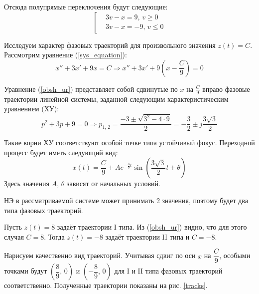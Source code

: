 	Отсюда полупрямые переключения будут следующие:
	\begin{equation}
		\left[\begin{aligned}
			&3v-x = 9,\,v\geq 0 \\
			&3v-x = -9,\,v\leq 0 
		\end{aligned}\right.
		\label{perekl}
	\end{equation}
	
	Исследуем характер фазовых траекторий для произвольного значения $z(t) = C$. Рассмотрим уравнение (\ref{sys_equation}):
	\begin{equation}
		x''+3x'+9x = C \Rightarrow x'' + 3x' + 9\left(x-\frac{C}{9}\right) = 0
		\label{obsh_ur}
	\end{equation}
	 
	Уравнение (\ref{obsh_ur}) представляет собой сдвинутые по $x$ на $\frac{C}{9}$ вправо фазовые траектории линейной системы, заданной следующим характеристическим уравнением (ХУ):
	\begin{equation*}
		p^2 + 3p + 9 = 0 \Rightarrow p_{1,\,2} = \frac{-3\pm\sqrt{3^2 - 4\cdot9}}{2} = -\frac{3}{2} \pm j\frac{3\sqrt{3}}{2}
	\end{equation*}
	
	Такие корни ХУ соответствуют особой точке типа устойчивый фокус. Переходной процесс будет иметь следующий вид:
	\begin{equation*}
		x(t) = \frac{C}{9} + Ae^{-\frac{3}{2}t}\sin(\frac{3\sqrt{3}}{2}t + \theta)
	\end{equation*}
	Здесь значения $A,\,\theta$ зависят от начальных условий.
	
	НЭ в рассматриваемой системе может принимать 2 значения, поэтому будет два типа фазовых траекторий. 
	
	Пусть $z(t) = 8$ задаёт траектории I типа. Из (\ref{obsh_ur}) видно, что для этого случая $C=8$. Тогда $z(t) = -8$ задаёт траектории II типа и $C = -8$.
	
	Нарисуем качественно вид траекторий. Учитывая сдвиг по оси $x$ на $\dfrac{C}{9}$, особыми точками будут  $\left(\dfrac{8}{9},\,0\right)$ и $\left(-\dfrac{8}{9},\,0\right)$ для I и II типа фазовых траекторий соответственно. Полученные траектории показаны на рис. \ref{tracks}.
	
